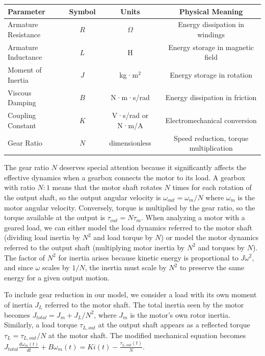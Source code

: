 \begin{center}
\begin{tabular}{|l|c|c|c|}
\hline
\textbf{Parameter} & \textbf{Symbol} & \textbf{Units} & \textbf{Physical Meaning} \\
\hline
Armature Resistance & $R$ & $\Omega$ & Energy dissipation in windings \\
\hline
Armature Inductance & $L$ & H & Energy storage in magnetic field \\
\hline
Moment of Inertia & $J$ & kg·m$^2$ & Energy storage in rotation \\
\hline
Viscous Damping & $B$ & N·m·s/rad & Energy dissipation in friction \\
\hline
Coupling Constant & $K$ & V·s/rad or N·m/A & Electromechanical conversion \\
\hline
Gear Ratio & $N$ & dimensionless & Speed reduction, torque multiplication \\
\hline
\end{tabular}
\end{center}

The gear ratio $N$ deserves special attention because it significantly affects the effective dynamics when a gearbox connects the motor to its load. A gearbox with ratio $N:1$ means that the motor shaft rotates $N$ times for each rotation of the output shaft, so the output angular velocity is $\omega_{out} = \omega_m / N$ where $\omega_m$ is the motor angular velocity. Conversely, torque is multiplied by the gear ratio, so the torque available at the output is $\tau_{out} = N \tau_m$. When analyzing a motor with a geared load, we can either model the load dynamics referred to the motor shaft (dividing load inertia by $N^2$ and load torque by $N$) or model the motor dynamics referred to the output shaft (multiplying motor inertia by $N^2$ and torques by $N$). The factor of $N^2$ for inertia arises because kinetic energy is proportional to $J\omega^2$, and since $\omega$ scales by $1/N$, the inertia must scale by $N^2$ to preserve the same energy for a given output motion.

To include gear reduction in our model, we consider a load with its own moment of inertia $J_L$ referred to the motor shaft. The total inertia seen by the motor becomes $J_{total} = J_m + J_L / N^2$, where $J_m$ is the motor's own rotor inertia. Similarly, a load torque $\tau_{L,out}$ at the output shaft appears as a reflected torque $\tau_L = \tau_{L,out} / N$ at the motor shaft. The modified mechanical equation becomes $J_{total} \frac{d\omega_m(t)}{dt} + B \omega_m(t) = K i(t) - \frac{\tau_{L,out}(t)}{N}$.

